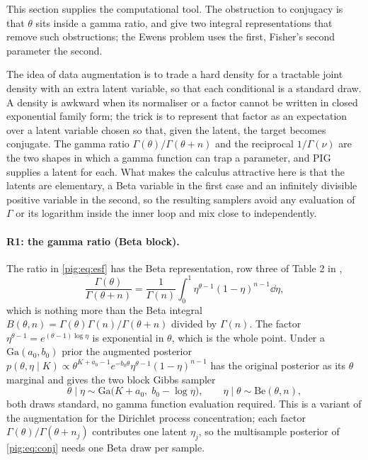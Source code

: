 This section supplies the computational tool. The obstruction to conjugacy is that $\theta$ sits inside a gamma ratio, and \citet{pig:he2022} give two integral representations that remove such obstructions; the Ewens problem uses the first, Fisher's second parameter the second.

The idea of data augmentation is to trade a hard density for a tractable joint density with an extra latent variable, so that each conditional is a standard draw. A density is awkward when its normaliser or a factor cannot be written in closed exponential family form; the trick is to represent that factor as an expectation over a latent variable chosen so that, given the latent, the target becomes conjugate. The gamma ratio $\Gamma(\theta)/\Gamma(\theta+n)$ and the reciprocal $1/\Gamma(\nu)$ are the two shapes in which a gamma function can trap a parameter, and PIG supplies a latent for each. What makes the calculus attractive here is that the latents are elementary, a Beta variable in the first case and an infinitely divisible positive variable in the second, so the resulting samplers avoid any evaluation of $\Gamma$ or its logarithm inside the inner loop and mix close to independently.

\paragraph{R1: the gamma ratio (Beta block).} The ratio in \eqref{pig:eq:esf} has the Beta representation, row three of Table 2 in \citet{pig:he2022},
\begin{equation}\label{pig:eq:beta}
\frac{\Gamma(\theta)}{\Gamma(\theta+n)}=\frac{1}{\Gamma(n)}\int_0^1\eta^{\theta-1}(1-\eta)^{n-1}\dd\eta,
\end{equation}
which is nothing more than the Beta integral $B(\theta,n)=\Gamma(\theta)\Gamma(n)/\Gamma(\theta+n)$ divided by $\Gamma(n)$. The factor $\eta^{\theta-1}=e^{(\theta-1)\log\eta}$ is exponential in $\theta$, which is the whole point. Under a $\mathrm{Ga}(a_0,b_0)$ prior the augmented posterior $p(\theta,\eta\mid K)\propto\theta^{K+a_0-1}e^{-b_0\theta}\eta^{\theta-1}(1-\eta)^{n-1}$ has the original posterior as its $\theta$ marginal and gives the two block Gibbs sampler
\begin{equation}\label{pig:eq:gibbs}
\theta\mid\eta\sim\mathrm{Ga}\bigl(K+a_0,\;b_0-\log\eta\bigr),\qquad\eta\mid\theta\sim\mathrm{Be}(\theta,n),
\end{equation}
both draws standard, no gamma function evaluation required. This is a variant of the \citet{pig:escobar1995} augmentation for the Dirichlet process concentration; each factor $\Gamma(\theta)/\Gamma(\theta+n_j)$ contributes one latent $\eta_j$, so the multisample posterior of \eqref{pig:eq:conj} needs one Beta draw per sample.


